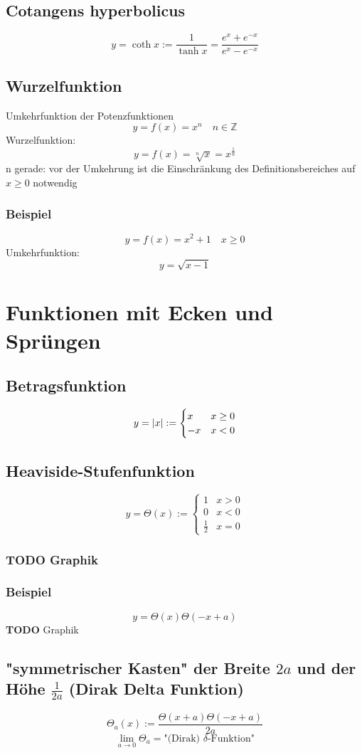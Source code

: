 \documentclass[a4paper]{scrartcl}
\DeclarePairedDelimiter\abs{\lvert}{\rvert}%
\begin{document}
\subsection{Cotangens hyperbolicus}
\label{sec-5-12}
\[y=\coth{x}:=\frac{1}{\tanh{x}}=\frac{e^x + e^{-x}}{e^x - e^{-x}}\]
\subsection{Wurzelfunktion}
\label{sec-5-13}
Umkehrfunktion der Potenzfunktionen \[y=f(x)=x^n\quad n\in\mathbb{Z}\]
Wurzelfunktion: \[y=f(x)=\sqrt[n]{x} = x^\frac{1}{n}\]
n gerade: vor der Umkehrung ist die Einschränkung des Definitionsbereiches auf $x\geq 0$ notwendig
\subsubsection{Beispiel}
\label{sec-5-13-1}
\[y=f(x)=x^2 + 1\quad x\geq 0\]
Umkehrfunktion: \[y=\sqrt{x-1}\]
\section{Funktionen mit Ecken und Sprüngen}
\label{sec-6}
\subsection{Betragsfunktion}
\label{sec-6-1}
\[y=\abs{x}:=\begin{cases}x& x \geq 0\\ -x& x < 0\end{cases}\]
\subsection{Heaviside-Stufenfunktion}
\label{sec-6-2}
\[y=\Theta(x):=\begin{cases}1&x>0\\0&x<0\\\frac{1}{2}&x=0\end{cases}\]
\subsubsection{{\bfseries\sffamily TODO} Graphik}
\label{sec-6-2-1}
\subsubsection{Beispiel}
\label{sec-6-2-2}
\[y=\Theta(x)\Theta(-x+a)\]
    \textbf{TODO} Graphik
\subsection{"symmetrischer Kasten" der Breite $2a$ und der Höhe $\frac{1}{2a}$ (Dirak Delta Funktion)}
\label{sec-6-3}
\[\Theta_a (x):=\frac{\Theta(x+a)\Theta(-x+a)}{2a}\]
\[\lim_{a\to 0}\Theta_a=\text{"(Dirak) $\delta$-Funktion"}\]
\end{document}

